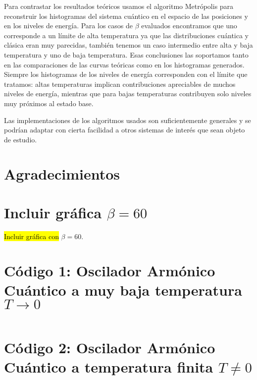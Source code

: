\documentclass[%
 reprint,
 amsmath,amssymb,
 aps,
 pra,
]{revtex4-2}
\begin{document}
Para contrastar los resultados teóricos usamos el algoritmo Metrópolis para reconstruir los histogramas del sistema cuántico en el espacio de las posiciones y en los niveles de energía. Para los casos de $\beta$ evaluados encontramos que uno corresponde a un límite de alta temperatura ya que las distribuciones cuántica y clásica eran muy parecidas, también tenemos un caso intermedio entre alta y baja temperatura y uno de baja temperatura. Esas conclusiones las soportamos tanto en las comparaciones de las curvas teóricas como en los histogramas generados. Siempre los histogramas de los niveles de energía corresponden con el límite que tratamos: altas temperaturas implican contribuciones apreciables de muchos niveles de energía, mientras que para bajas temperaturas contribuyen solo niveles muy próximos al estado base.

Las implementaciones de los algoritmos usados son suficientemente generales y se podrían adaptar con cierta facilidad a otros sistemas de interés que sean objeto de estudio. 
\section*{Agradecimientos}

\nocite{*}


\newpage



\appendix

\begin{widetext}

\section{Incluir gráfica  \texorpdfstring{$\beta=60$}{beta igual 60} \label{appx:beta-60} }
\hl{Incluir gráfica con} $\beta=60$. 

\section{Código 1: Oscilador Armónico Cuántico a muy baja temperatura \texorpdfstring{$T \rightarrow 0$}{T tendiendo a cero}\label{appx:codigo_baja_temperatura}}

\inputminted[linenos,breaklines]{python}{code_1.py}

\section{Código 2: Oscilador Armónico Cuántico a temperatura finita \texorpdfstring{$T \neq 0$}{T diferente de cero}\label{appx:codigo_temperatura_finita}}

\inputminted[linenos,breaklines]{python}{code_2.py}

\end{widetext}
\end{document}
